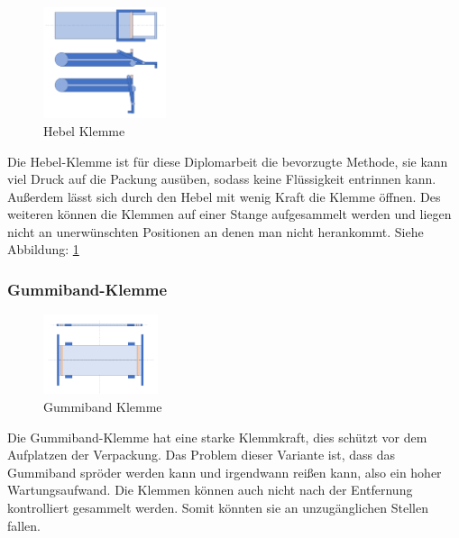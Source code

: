 \begin{figure}
\vspace{-30pt}
  \begin{center}
    \includegraphics[width=0.32\textwidth]{Bilder/Powerpoint/Hebel_Klemme}
  \end{center}
  \caption{Hebel Klemme}
  \label{Hebel Klemme}
  \vspace{-10pt}
\end{figure}

Die Hebel-Klemme ist für diese Diplomarbeit die bevorzugte Methode, sie kann viel Druck auf die Packung ausüben, sodass keine Flüssigkeit entrinnen kann. Außerdem lässt sich durch den Hebel mit wenig Kraft die Klemme öffnen. Des weiteren können die Klemmen auf einer Stange aufgesammelt werden und liegen nicht an unerwünschten Positionen an denen man nicht herankommt. Siehe Abbildung: \ref{Hebel Klemme}
 \vspace{40pt}


\subsubsection{Gummiband-Klemme}
 
\begin{figure}
\vspace{-40pt}
  \begin{center}
    \includegraphics[width=0.30\textwidth]{Bilder/Powerpoint/Gummiband_Klemme}
  \end{center}
  \caption{Gummiband Klemme}
  \label{Gummiband Klemme}
  \vspace{-10pt}
\end{figure}

Die Gummiband-Klemme hat eine starke Klemmkraft, dies schützt vor dem Aufplatzen der Verpackung. Das Problem dieser Variante ist, dass das Gummiband spröder werden kann und irgendwann reißen kann, also ein hoher Wartungsaufwand. Die Klemmen können auch nicht nach der Entfernung kontrolliert gesammelt werden. Somit könnten sie an unzugänglichen Stellen fallen.

